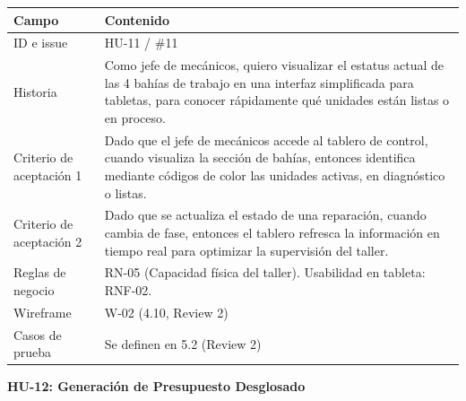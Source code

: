 {\def\LTcaptype{none} %
\begin{longtable}[]{@{}
  >{\raggedright\arraybackslash}p{}
  >{\raggedright\arraybackslash}p{}@{}}
\toprule\noalign{}
\begin{minipage}[b]{\linewidth}\raggedright
\textbf{Campo}
\end{minipage} & \begin{minipage}[b]{\linewidth}\raggedright
\textbf{Contenido}
\end{minipage} \\
\midrule\noalign{}
\endhead
\bottomrule\noalign{}
\endlastfoot
ID e issue & HU-11 / \#11 \\
Historia & Como jefe de mecánicos, quiero visualizar el estatus actual
de las 4 bahías de trabajo en una interfaz simplificada para tabletas,
para conocer rápidamente qué unidades están listas o en proceso. \\
Criterio de aceptación 1 & Dado que el jefe de mecánicos accede al
tablero de control, cuando visualiza la sección de bahías, entonces
identifica mediante códigos de color las unidades activas, en
diagnóstico o listas. \\
Criterio de aceptación 2 & Dado que se actualiza el estado de una
reparación, cuando cambia de fase, entonces el tablero refresca la
información en tiempo real para optimizar la supervisión del taller. \\
Reglas de negocio & RN-05 (Capacidad física del taller). Usabilidad en
tableta: RNF-02. \\
Wireframe & W-02 (4.10, Review 2) \\
Casos de prueba & Se definen en 5.2 (Review 2) \\
\end{longtable}
}

\textbf{HU-12: Generación de Presupuesto Desglosado}

